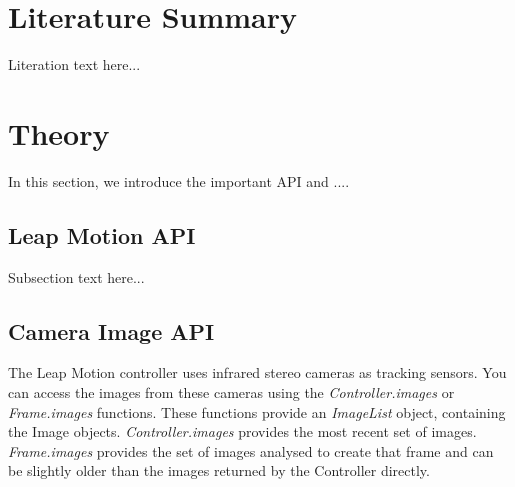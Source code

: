 \documentclass[journal]{IEEEtran}										    %
\begin{document}
    \section{Literature Summary}                                            %
        Literation text here...


        \section{Theory}
        In this section, we introduce the important API and ....

            \subsection{Leap Motion API}
            Subsection text here...

            \subsection{Camera Image API}
                The Leap Motion controller uses infrared stereo cameras
                as tracking sensors. You can access the images from 
                these cameras using the \emph{Controller.images} or 
                \emph{Frame.images} functions. These functions provide 
                an \emph{ImageList} object, containing the Image objects. 
                \emph{Controller.images} provides the most recent set of images. 
                \emph{Frame.images} provides the set of images analysed to 
                create that frame and can be slightly older than the 
                images returned by the Controller directly. \\
\end{document}
